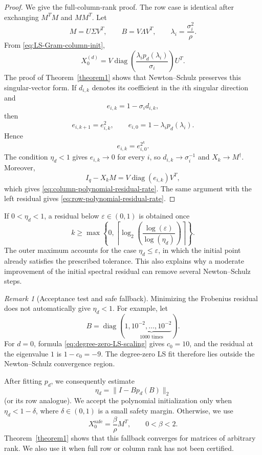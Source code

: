 \documentclass[12pt,a4paper]{article}
\theoremstyle{plain}
\theoremstyle{definition}
\theoremstyle{remark}
\newtheorem{remark}[theorem]{Remark}
\begin{document}
\begin{proof}
We give the full-column-rank proof.  The row case is identical after exchanging $M^TM$ and $MM^T$.  Let
\[
    M=U\Sigma V^T, \qquad B=V\Lambda V^T, \qquad \lambda_i=\frac{\sigma_i^2}{\rho}.
\]
From \eqref{eq:LS-Gram-column-init},
\[
    X_0^{(d)} = V\operatorname{diag}\!\left( \frac{\lambda_i p_d(\lambda_i)}{\sigma_i} \right)U^T.
\]
The proof of Theorem~\ref{theorem1} shows that Newton--Schulz preserves this singular-vector form.  If $d_{i,k}$ denotes its coefficient in the $i$th singular direction and
\[
    e_{i,k}=1-\sigma_i d_{i,k},
\]
then
\[
    e_{i,k+1}=e_{i,k}^2, \qquad  e_{i,0}=1-\lambda_i p_d(\lambda_i).
\]
Hence
\[
    e_{i,k}=e_{i,0}^{2^k}.
\]
The condition $\eta_d<1$ gives $e_{i,k}\to0$ for every $i$, so $d_{i,k}\to\sigma_i^{-1}$ and $X_k\to M^\dagger$.  Moreover,
\[
    I_q-X_kM = V\operatorname{diag}(e_{i,k})V^T,
\]
which gives \eqref{eq:column-polynomial-residual-rate}.  The same argument with the left residual gives \eqref{eq:row-polynomial-residual-rate}.
\end{proof}

If \(0<\eta_d<1\), a residual below
\(\varepsilon\in(0,1)\) is obtained once
\begin{equation}\label{eq:polynomial-iteration-count}
    k \geq \max\left\{0, \left\lceil \log_2\!\left( \frac{\log(\varepsilon)}{\log(\eta_d)} \right) \right\rceil \right\}.
\end{equation}
The outer maximum accounts for the case \(\eta_d\leq\varepsilon\), in which the initial point already satisfies the prescribed tolerance. This also explains why a moderate improvement of the initial spectral residual can remove several Newton--Schulz steps.

\begin{remark}[Acceptance test and safe fallback]
\label{rem:LS-does-not-guarantee-NS}
Minimizing the Frobenius residual does not automatically give $\eta_d<1$.  For example, let
\[
B=\operatorname{diag}(1,\underbrace{10^{-2},\ldots,10^{-2}}_{1000\text{ times}}).
\]
For $d=0$, formula \eqref{eq:degree-zero-LS-scaling} gives $c_0=10$, and the residual at the eigenvalue $1$ is $1-c_0=-9$.  The degree-zero LS fit therefore lies outside the Newton--Schulz convergence region.

After fitting $p_d$, we consequently estimate
\[
\eta_d=\|I-Bp_d(B)\|_2
\]
(or its row analogue).  We accept the polynomial initialization only when $\eta_d<1-\delta$, where $\delta\in(0,1)$ is a small safety margin.  Otherwise, we use
\begin{equation}
\label{eq:LS-Gram-safe-fallback}
X_0^{\mathrm{safe}}=\frac{\beta}{\rho}M^T,
\qquad 0<\beta<2.
\end{equation}
Theorem~\ref{theorem1} shows that this fallback converges for matrices of arbitrary rank.  We also use it when full row or column rank has not been certified.
\end{remark}
\end{document}
